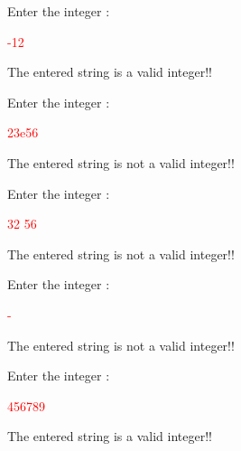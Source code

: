\begin{sample}
Enter the integer :

\textcolor{red}{-12}

The entered string is a valid integer!!
\end{sample}

\begin{sample}
Enter the integer :

\textcolor{red}{23e56}

The entered string is not a valid integer!!
\end{sample}

\begin{sample}
Enter the integer :

\textcolor{red}{32 56}

The entered string is not a valid integer!!
\end{sample}

\begin{sample}
Enter the integer :

\textcolor{red}{-}

The entered string is not a valid integer!!
\end{sample}

\begin{sample}
Enter the integer :

\textcolor{red}{456789}

The entered string is a valid integer!!
\end{sample}